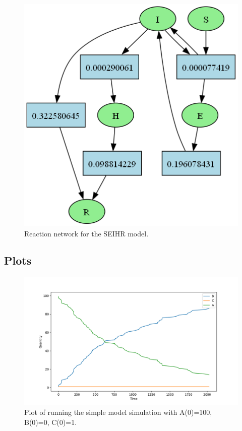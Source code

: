 \begin{figure}[H]
\begin{minipage}[t][6cm][t]{.38\textwidth}
        \includegraphics[width=\linewidth]{networks/seihr.png}
        \caption{Reaction network for the SEIHR model.}
        \label{fig:network_seihr}
    \end{minipage}
\end{figure}

\subsection{Plots}
\begin{figure}[H]
	\centering
	\includegraphics[width=\textwidth]{../plots/simple1}
	\caption{Plot of running the simple model simulation with A(0)=100, B(0)=0, C(0)=1.}
	\label{fig:plot_simple1}
\end{figure}

